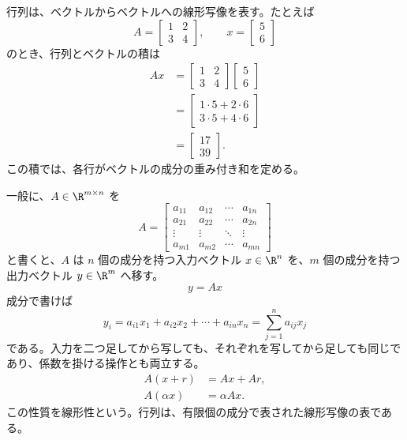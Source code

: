 行列は、ベクトルからベクトルへの線形写像を表す。たとえば
\begin{equation}
  A=\begin{bmatrix}1&2\\3&4\end{bmatrix},
  \qquad
  x=\begin{bmatrix}5\\6\end{bmatrix}
\end{equation}
のとき、行列とベクトルの積は
\begin{align}
  Ax
  &=\begin{bmatrix}1&2\\3&4\end{bmatrix}
    \begin{bmatrix}5\\6\end{bmatrix}\\
  &=\begin{bmatrix}1\cdot5+2\cdot6\\3\cdot5+4\cdot6\end{bmatrix}\\
  &=\begin{bmatrix}17\\39\end{bmatrix}.
\end{align}
この積では、各行がベクトルの成分の重み付き和を定める。

一般に、$A\in\R^{m\times n}$ を
\begin{equation}
  A=
  \begin{bmatrix}
    a_{11}&a_{12}&\cdots&a_{1n}\\
    a_{21}&a_{22}&\cdots&a_{2n}\\
    \vdots&\vdots&\ddots&\vdots\\
    a_{m1}&a_{m2}&\cdots&a_{mn}
  \end{bmatrix}
\end{equation}
と書くと、$A$ は $n$ 個の成分を持つ入力ベクトル $x\in\R^n$ を、$m$ 個の成分を持つ出力ベクトル $y\in\R^m$ へ移す。
\begin{equation}
  y=Ax
\end{equation}
成分で書けば
\begin{equation}
  y_i=a_{i1}x_1+a_{i2}x_2+\cdots+a_{in}x_n
  =
  \sum_{j=1}^{n}a_{ij}x_j
\end{equation}
である。入力を二つ足してから写しても、それぞれを写してから足しても同じであり、係数を掛ける操作とも両立する。
\begin{align}
  A(x+r)&=Ax+Ar,\\
  A(\alpha x)&=\alpha Ax.
\end{align}
この性質を線形性という。行列は、有限個の成分で表された線形写像の表である。

